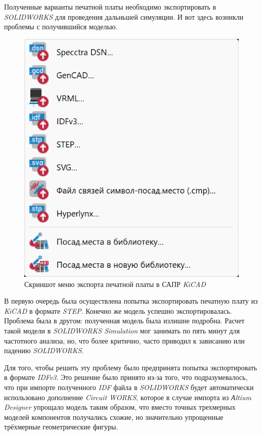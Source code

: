 Полученные варианты печатной платы необходимо экспортировать в \textit{SOLIDWORKS} для проведения дальньшей симуляции. И вот здесь возникли проблемы с получившийся моделью.

\begin{figure}[h]
  \centering
  \includegraphics[scale = 0.4]{../img/scrot/Screenshot-2024-05-06-191242.png}
  \caption{Скриншот меню экспорта печатной платы в САПР \textit{KiCAD} }
\end{figure}

В первую очередь была осуществлена попытка экспортировать печатную плату из \textit{KiCAD} в формате \textit{STEP}. Конечно же модель успешно экспортировалась. Проблема была в другом: полученная модель была излишне подробна. Расчет такой модели в \textit{SOLIDWORKS Simulation} мог занимать по пять минут для частотного анализа, но, что более критично, часто приводил к зависанию или падению \textit{SOLIDWORKS}.

Для того, чтобы решить эту проблему было предпринята попытка экспортировать в формате \textit{IDFv3}. Это решение было принято из-за того, что подразумевалось,
что при импорте полученного \textit{IDF} файла в \textit{SOLIDWORKS} будет автоматически использовано дополнение \textit{Circuit WORKS}, которое в случае импорта из \textit{Аltium Designer} упрощало модель таким образом, что вместо точных трехмерных моделей компонентов получались схожие, но значительно упрощенные трёхмерные геометрические фигуры.


